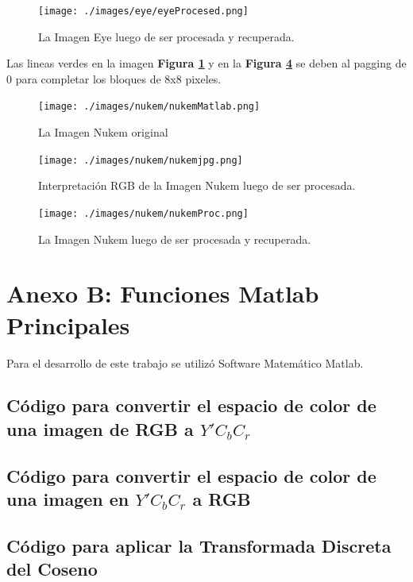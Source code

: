 \documentclass[%
	final,
	reprint,
	notitlepage,
	narroweqnarray,
	inline,
	twoside,
	invited
	]{ieee}
\begin{document}
\begin{figure}[H]
\centering
	\texttt{[image: ./images/eye/eyeProcesed.png]}
	\caption{La Imagen Eye luego de ser procesada y recuperada.}
\label{eyeProcesed}
\end{figure}

\par
Las lineas verdes en la imagen \textbf{Figura \ref{eyeProcesed}} y en la \textbf{Figura \ref{nukemProc}} se deben al pagging de 0 para completar los bloques de 8x8 pixeles.


\begin{figure}[H]
\centering
	\texttt{[image: ./images/nukem/nukemMatlab.png]}
	\caption{La Imagen Nukem original}
\label{nukemMatlab}
\end{figure}


\begin{figure}[H]
\centering
	\texttt{[image: ./images/nukem/nukemjpg.png]}
	\caption{Interpretación RGB de la Imagen Nukem luego de ser procesada.}
\label{nukemjpg}
\end{figure}

\begin{figure}[H]
\centering
	\texttt{[image: ./images/nukem/nukemProc.png]}
	\caption{La Imagen Nukem luego de ser procesada y recuperada.}
\label{nukemProc}
\end{figure}


\section*{Anexo B: Funciones Matlab Principales}
Para el desarrollo de este trabajo se utilizó Software Matemático Matlab.

\subsection{Código para convertir el espacio de color de una imagen de RGB a $Y'C_bC_r$}


\newpage
\subsection{Código para convertir el espacio de color de una imagen en $Y'C_bC_r$ a RGB}


\subsection{Código para aplicar la Transformada Discreta del Coseno}
\end{document}
